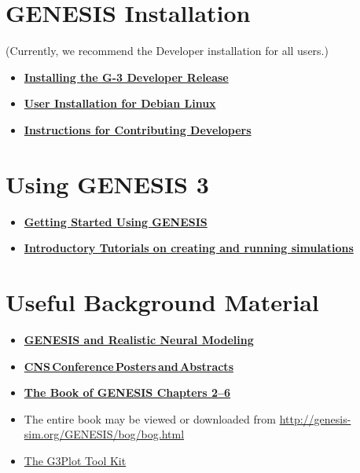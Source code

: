 \documentclass[12pt]{article}
\begin{document}
\section*{GENESIS Installation}

(Currently, we recommend the Developer installation for all users.)

\begin{itemize}

\item[] \href{../developer-installation/developer-installation.tex}{\bf Installing the G-3 Developer Release}
\item[] \href{../installation-debian/installation-debian.tex}{\bf User Installation for Debian Linux}
\item[] \href{../installation-developer/installation-developer.tex}{\bf Instructions for
         Contributing Developers}
\end{itemize}

\section*{Using GENESIS 3}
\begin{itemize}
   \item[]\href{../getting-started/getting-started.tex}{\bf Getting Started Using GENESIS}

   \item[]\href{../tutorial-genesis/tutorial-genesis.tex}{\bf Introductory
          Tutorials on creating and running simulations}
\end{itemize}

\section*{Useful Background Material}

\begin{itemize}
   \item[]\href{../background-material/background-material.tex}{\bf GENESIS and Realistic
          Neural Modeling}
   \item[]\href{../cns/cns.tex}{\bf CNS\,Conference\,Posters\,and\,Abstracts}
   \item[]\href{../book-of-genesis/book-of-genesis.tex}{\bf The Book of GENESIS Chapters 2--6}
\item[] The entire book may be viewed or downloaded from
\href{http://genesis-sim.org/GENESIS/bog/bog.html}{http://genesis-sim.org/GENESIS/bog/bog.html}
   \item[]\href{../g3plot/g3plot.html}{The G3Plot Tool Kit}

\end{itemize}
\end{document}

